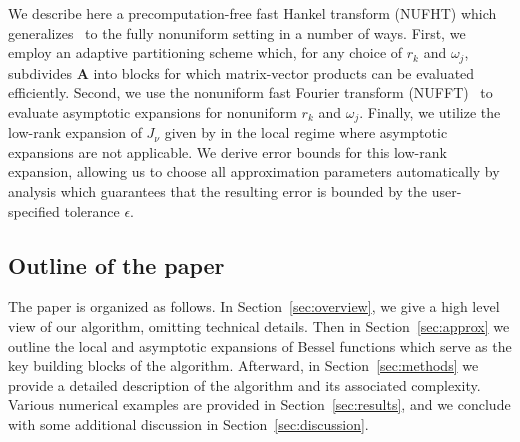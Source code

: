 We describe here a precomputation-free fast Hankel transform (NUFHT) which
generalizes~\cite{townsend2015fast} to the fully nonuniform setting in a number
of ways. First, we employ an adaptive partitioning scheme which, for any choice
of $r_k$ and $\omega_j$, subdivides $\bm{A}$ into blocks for which matrix-vector
products can be evaluated efficiently. Second, we use the nonuniform fast
Fourier transform (NUFFT)~\cite{dutt1993fast, greengard2004accelerating} to
evaluate asymptotic expansions for nonuniform $r_k$ and $\omega_j$. Finally, we
utilize the low-rank expansion of $J_\nu$ given by \cite{wimp1962polynomial} in
the local regime where asymptotic expansions are not applicable. We derive error
bounds for this low-rank expansion, allowing us to choose all approximation
parameters automatically by analysis which guarantees that the resulting error
is bounded by the user-specified tolerance $\epsilon$.

\subsection*{Outline of the paper}

The paper is organized as follows. In Section~\ref{sec:overview}, we give a high
level view of our algorithm, omitting technical details. Then in
Section~\ref{sec:approx} we outline the local and asymptotic expansions of
Bessel functions which serve as the key building blocks of the algorithm.
Afterward, in Section~\ref{sec:methods} we provide a detailed description of the
algorithm and its associated complexity. Various numerical examples are provided
in Section~\ref{sec:results}, and we conclude with some additional discussion in
Section~\ref{sec:discussion}.


